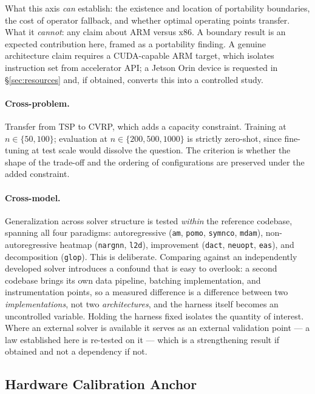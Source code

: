 \documentclass[11pt,a4paper,twocolumn]{article}
\begin{document}
What this axis \emph{can} establish: the existence and location of portability
boundaries, the cost of operator fallback, and whether optimal operating points
transfer. What it \emph{cannot}: any claim about ARM versus x86. A boundary result
is an expected contribution here, framed as a portability finding. A genuine
architecture claim requires a CUDA-capable ARM target, which isolates instruction
set from accelerator API; a Jetson Orin device is requested in \S\ref{sec:resources}
and, if obtained, converts this into a controlled study.

\paragraph{Cross-problem.} Transfer from TSP to CVRP, which adds a capacity
constraint. Training at $n \in \{50,100\}$; evaluation at $n \in \{200,500,1000\}$
is strictly zero-shot, since fine-tuning at test scale would dissolve the question.
The criterion is whether the shape of the trade-off and the ordering of
configurations are preserved under the added constraint.

\paragraph{Cross-model.} Generalization across solver structure is tested
\emph{within} the reference codebase, spanning all four paradigms: autoregressive
(\texttt{am}, \texttt{pomo}, \texttt{symnco}, \texttt{mdam}), non-autoregressive
heatmap (\texttt{nargnn}, \texttt{l2d}), improvement (\texttt{dact},
\texttt{neuopt}, \texttt{eas}), and decomposition (\texttt{glop}). This is
deliberate. Comparing against an independently developed solver introduces a
confound that is easy to overlook: a second codebase brings its own data pipeline,
batching implementation, and instrumentation points, so a measured difference is a
difference between two \emph{implementations}, not two \emph{architectures}, and the
harness itself becomes an uncontrolled variable. Holding the harness fixed isolates
the quantity of interest. Where an external solver is available it serves as an
external validation point --- a law established here is re-tested on it --- which is
a strengthening result if obtained and not a dependency if not.

\subsection{Hardware Calibration Anchor}
\label{sec:anchor}
\end{document}
